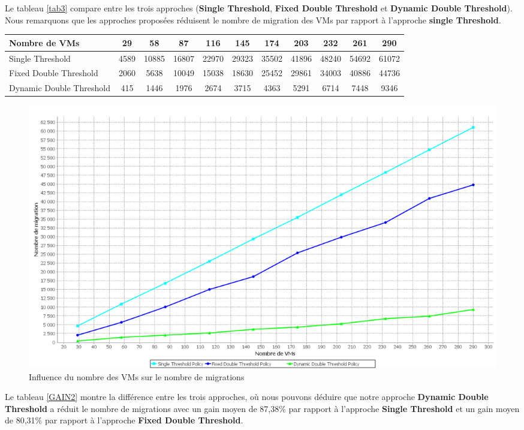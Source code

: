 \begin{onehalfspace}
Le tableau \ref{tab3} compare entre les trois approches (\textbf{Single Threshold}, \textbf{Fixed Double Threshold} et \textbf{ Dynamic Double Threshold}). Nous remarquons  que les  approches proposées réduisent le nombre de migration des VMs par rapport à l’approche \textbf{single Threshold}.

\begin{center}
{\scriptsize   \begin{tabular}{|p{2.5cm}|c|c|c|c|c|c|c|c|c|c|}
\hline
      \centering     Nombre de VMs &  29& 58& 87& 116& 145& 174& 203& 232& 261& 290\\
\hline
      \centering      Single Threshold &  4589& 10885& 16807& 22970& 29323& 35502& 41896& 48240& 54692& 61072\\
\hline
      \centering      Fixed Double Threshold &  2060& 5638& 10049& 15038& 18630& 25452& 29861& 34003& 40886& 44736\\
\hline
      \centering     Dynamic Double Threshold &  415& 1446& 1976& 2674& 3715& 4363& 5291& 6714& 7448& 9346\\
\hline
\end{tabular}}
\label{tab3}
\end{center}

\begin{figure}[!h]
\begin{center}
\includegraphics[scale=0.35]{figures/sh2.png} 
\end{center}
\caption{Influence du nombre des VMs sur le nombre de migrations}
\label{InNVMEnM}
\end{figure}

Le tableau \ref{GAIN2} montre la différence entre les trois approches, où nous pouvons déduire que notre approche \textbf{Dynamic Double Threshold} a réduit le nombre de migrations avec un gain moyen de 87,38\% par rapport à l'approche \textbf{Single Threshold} et un gain moyen de 80,31\% par rapport à l'approche \textbf{Fixed Double Threshold}.\\



\end{onehalfspace}

